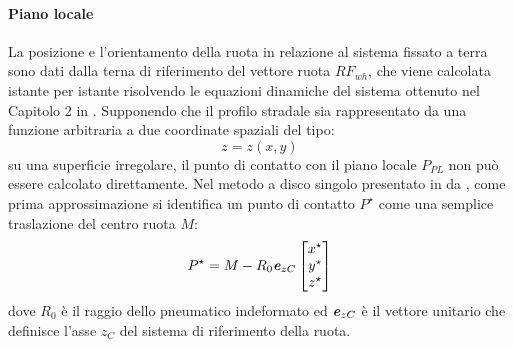 \paragraph{Piano locale}
La posizione e l'orientamento della ruota in relazione al sistema fissato a terra sono dati dalla terna di riferimento del vettore ruota $RF_{wh}$, che viene calcolata istante per istante risolvendo le equazioni dinamiche del sistema ottenuto nel Capitolo 2 in \cite{Larcher}. Supponendo che il profilo stradale sia rappresentato da una funzione arbitraria a due coordinate spaziali del tipo: 
%
\begin{equation}
z=z(x,y)
\end{equation}
%
su una superficie irregolare, il punto di contatto con il piano locale $P_{PL}$ non può essere calcolato direttamente. Nel metodo a disco singolo presentato in \cite{Rill} da \citeauthor{Rill}, come prima approssimazione si identifica un punto di contatto $P^\star$ come una semplice traslazione del centro ruota $M$:
%
\begin{equation}
P^\star = M-R_0\textbf{\textit{e}}_{zC}
\begin{bmatrix}
x^\star\\
y^\star\\
z^\star
\end{bmatrix}
\end{equation}
%
dove $R_0$ è il raggio dello pneumatico indeformato ed $\textbf{\textit{e}}_{zC}$ è il vettore unitario che definisce l'asse $z_C$ del sistema di riferimento della ruota.

